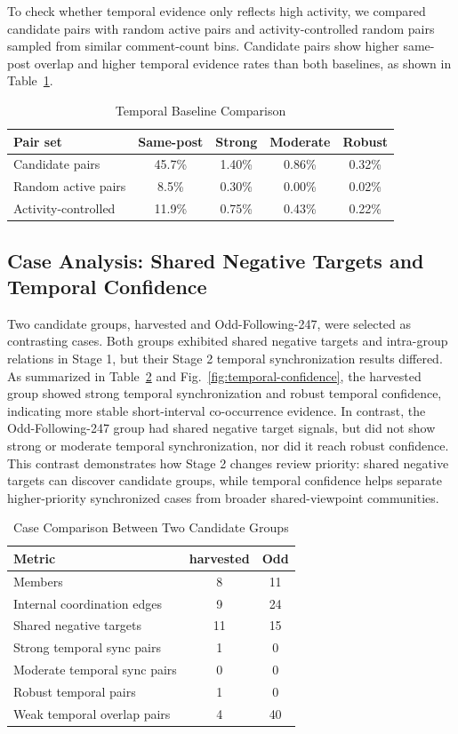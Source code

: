 \documentclass[conference]{IEEEtran}
\begin{document}
To check whether temporal evidence only reflects high activity, we compared candidate pairs with random active pairs and activity-controlled random pairs sampled from similar comment-count bins. Candidate pairs show higher same-post overlap and higher temporal evidence rates than both baselines, as shown in Table~\ref{tab:temporal-baseline}.

\begin{table}[htbp]
\caption{Temporal Baseline Comparison}
\label{tab:temporal-baseline}
\centering
\begin{tabular}{lcccc}
\toprule
\textbf{Pair set} & \textbf{Same-post} & \textbf{Strong} & \textbf{Moderate} & \textbf{Robust} \\
\midrule
Candidate pairs & 45.7\% & 1.40\% & 0.86\% & 0.32\% \\
Random active pairs & 8.5\% & 0.30\% & 0.00\% & 0.02\% \\
Activity-controlled & 11.9\% & 0.75\% & 0.43\% & 0.22\% \\
\bottomrule
\end{tabular}
\end{table}

\subsection{Case Analysis: Shared Negative Targets and Temporal Confidence}
Two candidate groups, harvested and Odd-Following-247, were selected as contrasting cases. Both groups exhibited shared negative targets and intra-group relations in Stage 1, but their Stage 2 temporal synchronization results differed. As summarized in Table~\ref{tab:case-comparison} and Fig.~\ref{fig:temporal-confidence}, the harvested group showed strong temporal synchronization and robust temporal confidence, indicating more stable short-interval co-occurrence evidence. In contrast, the Odd-Following-247 group had shared negative target signals, but did not show strong or moderate temporal synchronization, nor did it reach robust confidence. This contrast demonstrates how Stage 2 changes review priority: shared negative targets can discover candidate groups, while temporal confidence helps separate higher-priority synchronized cases from broader shared-viewpoint communities.

\begin{table}[htbp]
\caption{Case Comparison Between Two Candidate Groups}
\label{tab:case-comparison}
\centering
\begin{tabular}{lcc}
\toprule
\textbf{Metric} & \textbf{harvested} & \textbf{Odd} \\
\midrule
Members & 8 & 11 \\
Internal coordination edges & 9 & 24 \\
Shared negative targets & 11 & 15 \\
Strong temporal sync pairs & 1 & 0 \\
Moderate temporal sync pairs & 0 & 0 \\
Robust temporal pairs & 1 & 0 \\
Weak temporal overlap pairs & 4 & 40 \\
\bottomrule
\end{tabular}
\end{table}
\end{document}
